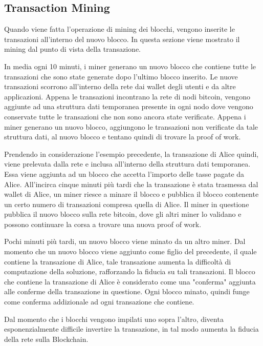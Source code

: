 \subsection{Transaction Mining}

Quando viene fatta l'operazione di mining dei blocchi, vengono inserite le transazioni all'interno del nuovo blocco. In questa sezione viene mostrato il mining dal punto di vista della transazione.

In media ogni 10 minuti, i miner generano un nuovo blocco che contiene tutte le transazioni che sono state generate dopo l'ultimo blocco inserito. Le nuove transazioni scorrono all'interno della rete dai wallet degli utenti e da altre applicazioni. Appena le transazioni incontrano la rete di nodi bitcoin, vengono aggiunte ad una struttura dati temporanea presente in ogni nodo dove vengono conservate tutte le transazioni che non sono ancora state verificate. Appena i miner generano un nuovo blocco, aggiungono le transazioni non verificate da tale struttura dati, al nuovo blocco e tentano quindi di trovare la proof of work.

Prendendo in considerazione l'esempio precedente, la transazione di Alice quindi, viene prelevata dalla rete e inclusa all'interno della struttura dati temporanea. Essa viene aggiunta ad un blocco che accetta l'importo delle tasse pagate da Alice. All'incirca cinque minuti più tardi che la transazione è stata trasmessa dal wallet di Alice, un miner riesce a minare il blocco e pubblica il blocco contenente un certo numero di transazioni compresa quella di Alice. Il miner in questione pubblica il nuovo blocco sulla rete bitcoin, dove gli altri miner lo validano e possono continuare la corsa a trovare una nuova proof of work.

Pochi minuti più tardi, un nuovo blocco viene minato da un altro miner. Dal momento che un nuovo blocco viene aggiunto come figlio del precedente, il quale contiene la transazione di Alice, tale transazione aumenta la difficoltà di computazione della soluzione, rafforzando la fiducia su tali transazioni. Il blocco che contiene la transazione di Alice è considerato come una "conferma" aggiunta alle conferme della transazione in questione. Ogni blocco minato, quindi funge come conferma addizionale ad ogni transazione che contiene. 

Dal momento che i blocchi vengono impilati uno sopra l'altro, diventa esponenzialmente difficile invertire la transazione, in tal modo aumenta la fiducia della rete sulla Blockchain. 

